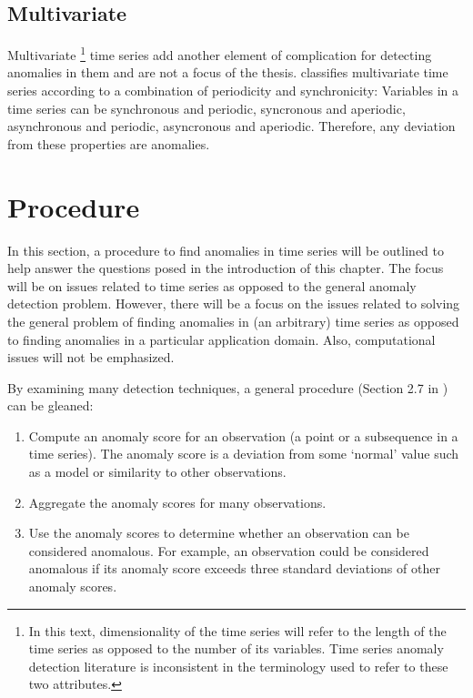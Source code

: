 \subsection{Multivariate}

Multivariate \footnote{In this text, dimensionality of the time series will refer to the length of the time series as opposed to the number of its variables. Time series anomaly detection literature is inconsistent in the terminology used to refer to these two attributes.} time series add another element of complication for detecting anomalies in them and are not a focus of the thesis. \cite{Cheboli2010} classifies multivariate time series according to a combination of periodicity and synchronicity: Variables in a time series can be synchronous and periodic, syncronous and aperiodic, asynchronous and periodic, asyncronous and aperiodic. Therefore, any deviation from these properties are anomalies.




\section{Procedure}


In this section, a procedure to find anomalies in time series will be outlined to help answer the questions posed in the introduction of this chapter. The focus will be on issues related to time series as opposed to the general anomaly detection problem. However, there will be a focus on the issues related to solving the general problem of finding anomalies in (an arbitrary) time series as opposed to finding anomalies in a particular application domain. Also, computational issues will not be emphasized.

By examining many detection techniques, a general procedure (Section 2.7 in \cite{Cheboli2010}) can be gleaned:

\begin{enumerate}
\item Compute an anomaly score for an observation (a point or a subsequence in a time series). The anomaly score is a deviation from some `normal' value such as a model or similarity to other observations.
\item Aggregate the anomaly scores for many observations.
\item Use the anomaly scores to determine whether an observation can be considered anomalous. For example, an observation could be considered anomalous if its anomaly score exceeds three standard deviations of other anomaly scores.
\end{enumerate}

